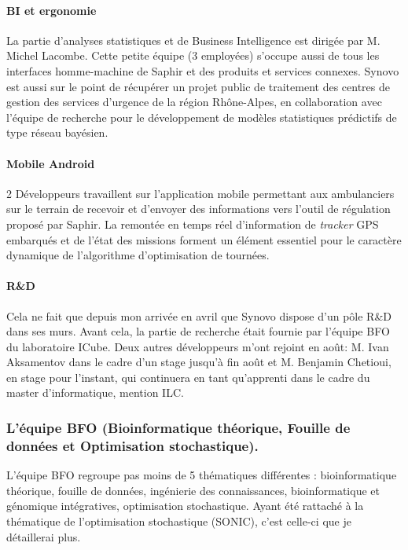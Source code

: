 \documentclass[french, 11pt]{memoir}
\begin{document}
\paragraph{BI et ergonomie}\label{bi-et-ergonomie}

La partie d'analyses statistiques et de Business Intelligence est
dirigée par M. Michel Lacombe. Cette petite équipe (3 employées)
s'occupe aussi de tous les interfaces homme-machine de Saphir et des
produits et services connexes. Synovo est aussi sur le point de
récupérer un projet public de traitement des centres de gestion des
services d'urgence de la région Rhône-Alpes, en collaboration avec
l'équipe de recherche pour le développement de modèles statistiques
prédictifs de type réseau bayésien.

\paragraph{Mobile Android}\label{mobile-android}

2 Développeurs travaillent sur l'application mobile permettant aux
ambulanciers sur le terrain de recevoir et d'envoyer des informations
vers l'outil de régulation proposé par Saphir. La remontée en temps réel
d'information de \emph{tracker} GPS embarqués et de l'état des missions
forment un élément essentiel pour le caractère dynamique de l'algorithme
d'optimisation de tournées.

\paragraph{R\&D}\label{rd}

Cela ne fait que depuis mon arrivée en avril que Synovo dispose d'un
pôle R\&D dans ses murs. Avant cela, la partie de recherche était
fournie par l'équipe BFO du laboratoire ICube. Deux autres développeurs
m'ont rejoint en août: M. Ivan Aksamentov dans le cadre d'un stage
jusqu'à fin août et M. Benjamin Chetioui, en stage pour l'instant, qui
continuera en tant qu'apprenti dans le cadre du master d'informatique,
mention ILC.

\subsubsection{L'équipe BFO (Bioinformatique théorique, Fouille de
	données et Optimisation
	stochastique).}\label{luxe9quipe-bfo-bioinformatique-thuxe9orique-fouille-de-donnuxe9es-et-optimisation-stochastique.}

L'équipe BFO regroupe pas moins de 5 thématiques différentes :
bioinformatique théorique, fouille de données, ingénierie des
connaissances, bioinformatique et génomique intégratives, optimisation
stochastique. Ayant été rattaché à la thématique de l'optimisation
stochastique (SONIC), c'est celle-ci que je détaillerai plus.
\end{document}
